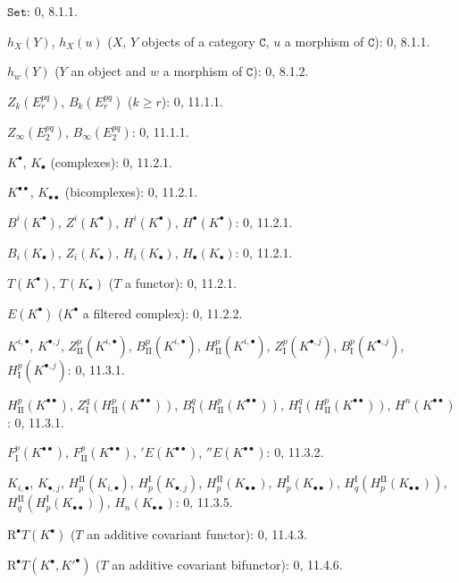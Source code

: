 \documentclass[oneside]{amsart}
\theoremstyle{ega-env-style}
\theoremstyle{ega-thm-env-style}
\theoremstyle{ega-defn-env-style}
\def\cat{\mathtt}                   %
\def\geq{\geqslant}                 %
\def\RR{\mathrm{R}}                 %
\def\C{\cat{C}}                     %
\def\Set{\cat{Set}}                 %
\begin{document}
\begin{flushleft}
$\Set$: 0, 8.1.1.

$h_X(Y)$, $h_X(u)$ ($X$, $Y$ objects of a category $\C$, $u$ a morphism
of $\C$): 0, 8.1.1.

$h_w(Y)$ ($Y$ an object and $w$ a morphism of $\C$): 0, 8.1.2.

$Z_k(E_r^{pq})$, $B_k(E_r^{pq})$ ($k\geq r$): 0, 11.1.1.

$Z_\infty(E_2^{pq})$, $B_\infty(E_2^{pq})$: 0, 11.1.1.

$K^\bullet$, $K_\bullet$ (complexes): 0, 11.2.1.

$K^{\bullet\bullet}$, $K_{\bullet\bullet}$ (bicomplexes): 0, 11.2.1.

$B^i(K^\bullet)$, $Z^i(K^\bullet)$, $H^i(K^\bullet)$,
$H^\bullet(K^\bullet)$: 0, 11.2.1.

$B_i(K_\bullet)$, $Z_i(K_\bullet)$, $H_i(K_\bullet)$,
$H_\bullet(K_\bullet)$: 0, 11.2.1.

$T(K^\bullet)$, $T(K_\bullet)$ ($T$ a functor): 0, 11.2.1.

$E(K^\bullet)$ ($K^\bullet$ a filtered complex): 0, 11.2.2.

$K^{i,\bullet}$, $K^{\bullet,j}$, $Z_{\mathrm{II}}^p(K^{i,\bullet})$,
$B_{\mathrm{II}}^p(K^{i,\bullet})$, $H_{\mathrm{II}}^p(K^{i,\bullet})$,
$Z_{\mathrm I}^p(K^{\bullet,j})$, $B_{\mathrm I}^p(K^{\bullet,j})$,
$H_{\mathrm I}^p(K^{\bullet,j})$: 0, 11.3.1.

$H_{\mathrm{II}}^p(K^{\bullet\bullet})$,
$Z_{\mathrm I}^q(H_{\mathrm{II}}^p(K^{\bullet\bullet}))$,
$B_{\mathrm I}^q(H_{\mathrm{II}}^p(K^{\bullet\bullet}))$,
$H_{\mathrm I}^q(H_{\mathrm{II}}^p(K^{\bullet\bullet}))$,
$H^n(K^{\bullet\bullet})$: 0, 11.3.1.

$F_{\mathrm I}^p(K^{\bullet\bullet})$,
$F_{\mathrm{II}}^p(K^{\bullet\bullet})$, ${}'E(K^{\bullet\bullet})$,
${}''E(K^{\bullet\bullet})$: 0, 11.3.2.

$K_{i,\bullet}$, $K_{\bullet,j}$, $H_p^{\mathrm{II}}(K_{i,\bullet})$,
$H_p^{\mathrm I}(K_{\bullet,j})$, $H_p^{\mathrm{II}}(K_{\bullet\bullet})$,
$H_p^{\mathrm I}(K_{\bullet\bullet})$,
$H_q^{\mathrm I}(H_p^{\mathrm{II}}(K_{\bullet\bullet}))$,
$H_q^{\mathrm{II}}(H_p^{\mathrm I}(K_{\bullet\bullet}))$,
$H_n(K_{\bullet\bullet})$: 0, 11.3.5.

$\RR^\bullet T(K^\bullet)$ ($T$ an additive covariant functor): 0, 11.4.3.

$\RR^\bullet T(K^\bullet,K'^{\bullet})$ ($T$ an additive covariant
bifunctor): 0, 11.4.6.


\end{flushleft}
\end{document}
